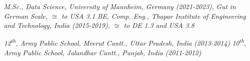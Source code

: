 


\begin{scholarship}
					{ \textit{M.Sc., Data Science, University of Mannheim, Germany (2021-2023), Gut in German Scale, $\cong$ to USA 3.1} }
					{ \textit{BE, Comp. Eng., Thapar Institute of Engineering and Technology, India (2015-2019), $\cong$ to DE 1.3 and USA 3.8}}

					{ \textit{12\textsuperscript{th}, Army Public School, Meerut Cantt., Uttar Pradesh, India (2013-2014)} }
					{ \textit{10\textsuperscript{th}, Army Public School, Jalandhar Cantt., Punjab, India (2011-2012)} }
\end{scholarship}